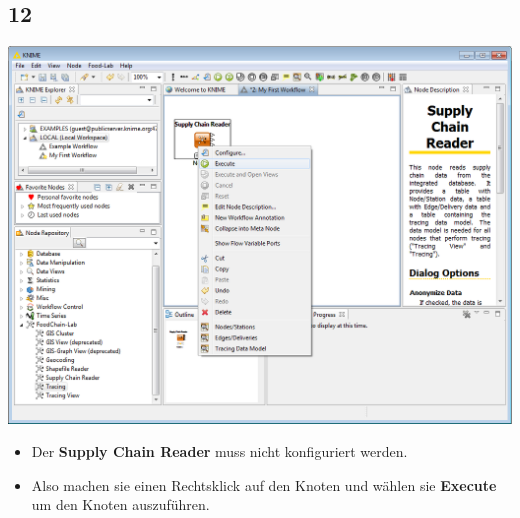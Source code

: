 \documentclass{beamer}
\begin{document}
\subsection{12}
\begin{frame}
	\begin{center}
  		\includegraphics[height=0.6\textheight]{12.png}
	\end{center}
	\begin{itemize}
		\item Der \textbf{Supply Chain Reader} muss nicht konfiguriert werden.
		\item Also machen sie einen Rechtsklick auf den Knoten und wählen sie \textbf{Execute} um den Knoten auszuführen.
	\end{itemize}
\end{frame}
\end{document}
